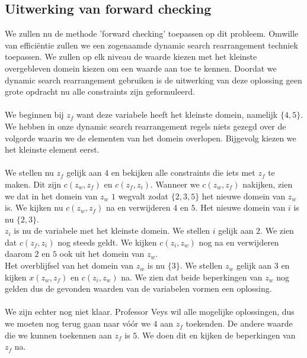 \documentclass[alternative-exam.tex]{subfiles}
\begin{document}
\subsection{Uitwerking van forward checking}
We zullen nu de methode 'forward checking' toepassen op dit probleem. Omwille van effici\"entie zullen we een zogenaamde dynamic search rearrangement techniek toepassen. We zullen op elk niveau de waarde kiezen met het kleinste overgebleven domein kiezen om een waarde aan toe te kennen.
Doordat we dynamic search rearrangement gebruiken is de uitwerking van deze oplossing geen grote opdracht nu alle constraints zijn geformuleerd.\\\\
We beginnen bij $z_f$ want deze variabele heeft het kleinste domein, namelijk $\{4,5\}$. We hebben in onze dynamic search rearrangement regels niets gezegd over de volgorde waarin we de elementen van het domein overlopen. Bijgevolg kiezen we het kleinste element eerst.\\\\
We stellen nu $z_f$ gelijk aan $4$ en bekijken alle constraints die iets met $z_f$ te maken. Dit zijn $c(z_w,z_f)$ en $c(z_f,z_i)$. Wanneer we $c(z_w,z_f)$ nakijken, zien we dat in het domein van $z_w$ $1$ wegvalt zodat $\{2,3,5\}$ het nieuwe domein van $z_w$ is. We kijken nu $c(z_w,z_f)$ na en verwijderen $4$ en $5$. Het nieuwe domein van $i$ is nu $\{2,3\}$.\\
$z_i$ is nu de variabele met het kleinste domein. We stellen $i$ gelijk aan $2$. We zien dat $c(z_f,z_i)$ nog steeds geldt. We kijken $c(z_i,z_w)$ nog na en verwijderen daarom $2$ en $5$ ook uit het domein van $z_w$.\\ Het overblijfsel van het domein van $z_w$ is nu $\{3\}$. We stellen $z_w$ gelijk aan $3$ en kijken $x(z_w,z_f)$ en $c(z_i,z_w)$ na. We zien dat beide beperkingen van $z_w$ nog gelden dus de gevonden waarden van de variabelen vormen een oplossing.\\\\
We zijn echter nog niet klaar. Professor Veys wil alle mogelijke oplossingen, dus we moeten nog terug gaan naar v\'o\'or we $4$ aan $z_f$ toekenden. De andere waarde die we kunnen toekennen aan $z_f$ is $5$. We doen dit en kijken de beperkingen van $z_f$ na.
\end{document}
